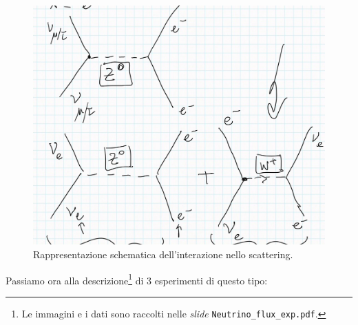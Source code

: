 \begin{figure}[h]
    \centering
    \includegraphics[scale=0.2]{Immagini/0322_Scambio.png}
    \caption{Rappresentazione schematica dell'interazione nello scattering.}
    \label{0322_scambio}
\end{figure}
\noindent Passiamo ora alla descrizione\footnote{Le immagini e i dati sono raccolti nelle \textit{slide} \texttt{Neutrino\_flux\_exp.pdf}.} di 3 esperimenti di questo tipo:
